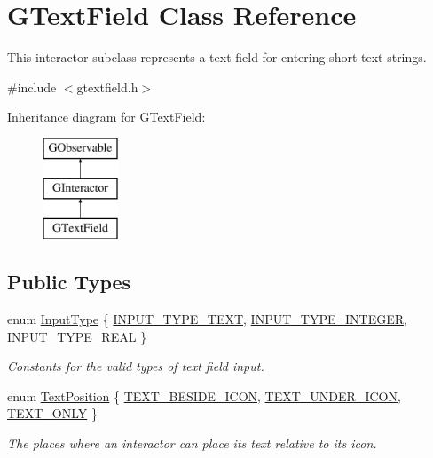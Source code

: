 \hypertarget{classGTextField}{}\section{G\+Text\+Field Class Reference}
\label{classGTextField}


This interactor subclass represents a text field for entering short text strings.  




{\ttfamily \#include $<$gtextfield.\+h$>$}

Inheritance diagram for G\+Text\+Field\+:\begin{figure}[H]
\begin{center}
\leavevmode
\includegraphics[height=3.000000cm]{classGTextField}
\end{center}
\end{figure}
\subsection*{Public Types}
\begin{DoxyCompactItemize}
\item 
enum \mbox{\hyperlink{classGTextField_a5fc772c800c3d40d2b95564e8a839bab}{Input\+Type}} \{ \mbox{\hyperlink{classGTextField_a5fc772c800c3d40d2b95564e8a839babadbd6303eaf17fd7715ddca85f2ac3287}{I\+N\+P\+U\+T\+\_\+\+T\+Y\+P\+E\+\_\+\+T\+E\+XT}}, 
\mbox{\hyperlink{classGTextField_a5fc772c800c3d40d2b95564e8a839babac37563ad86c1ac752795ed59e700be77}{I\+N\+P\+U\+T\+\_\+\+T\+Y\+P\+E\+\_\+\+I\+N\+T\+E\+G\+ER}}, 
\mbox{\hyperlink{classGTextField_a5fc772c800c3d40d2b95564e8a839babab760f99baafaf18281fa72664f303938}{I\+N\+P\+U\+T\+\_\+\+T\+Y\+P\+E\+\_\+\+R\+E\+AL}}
 \}
\begin{DoxyCompactList}\small\item\em Constants for the valid types of text field input. \end{DoxyCompactList}\item 
enum \mbox{\hyperlink{classGInteractor_a8e0d441725a81d2bbdebbea09078260e}{Text\+Position}} \{ \mbox{\hyperlink{classGInteractor_a8e0d441725a81d2bbdebbea09078260ea4cd6f2e7d5a08d6f4dc052df2358f774}{T\+E\+X\+T\+\_\+\+B\+E\+S\+I\+D\+E\+\_\+\+I\+C\+ON}}, 
\mbox{\hyperlink{classGInteractor_a8e0d441725a81d2bbdebbea09078260eaa88490f63d8de68d44c83bdb2ecde3b3}{T\+E\+X\+T\+\_\+\+U\+N\+D\+E\+R\+\_\+\+I\+C\+ON}}, 
\mbox{\hyperlink{classGInteractor_a8e0d441725a81d2bbdebbea09078260ea39a6f388a30ac4fefb6eb13e846bc9f2}{T\+E\+X\+T\+\_\+\+O\+N\+LY}}
 \}
\begin{DoxyCompactList}\small\item\em The places where an interactor can place its text relative to its icon. \end{DoxyCompactList}\end{DoxyCompactItemize}
